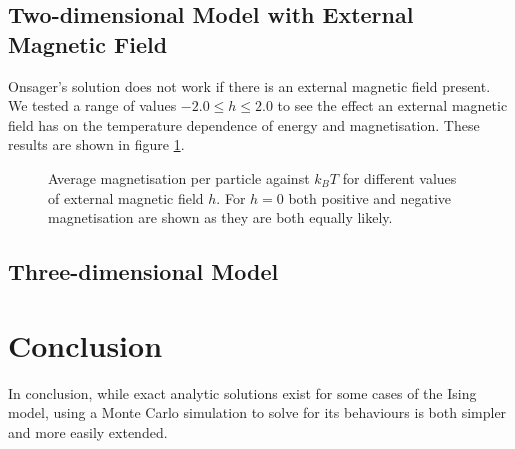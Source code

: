 \documentclass[11pt]{article}
\begin{document}
	\subsection{Two-dimensional Model with External Magnetic Field}
	
	Onsager's solution does not work if there is an external magnetic field present. We tested a range of values $-2.0 \leq h \leq 2.0$ to see the effect an external magnetic field has on the temperature dependence of energy and magnetisation. These results are shown in figure \ref{fig:2d_mag_results}.
	\begin{figure}[H]
		\begin{center}
		\end{center}
		\caption{Average magnetisation per particle against $k_BT$ for different values of external magnetic field $h$. For $h=0$ both positive and negative magnetisation are shown as they are both equally likely.}
		\label{fig:2d_mag_results}
	\end{figure}
	
	\subsection{Three-dimensional Model}
	
	\section{Conclusion}
	
	In conclusion, while exact analytic solutions exist for some cases of the Ising model, using a Monte Carlo simulation to solve for its behaviours is both simpler and more easily extended. 
		
	 
\end{document}
